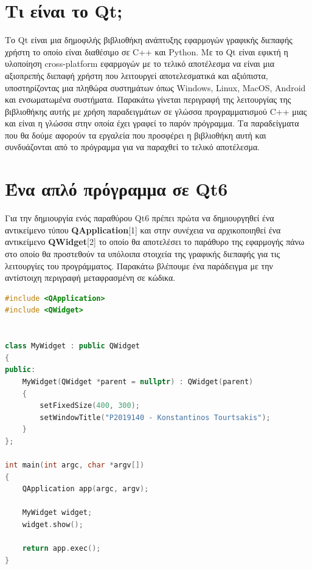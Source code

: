 




\section{Τι είναι το Qt;}
Το Qt είναι μια δημοφιλής βιβλιοθήκη ανάπτυξης εφαρμογών γραφικής διεπαφής 
χρήστη το οποίο είναι διαθέσιμο σε C++ και Python. Με το Qt
είναι εφικτή η υλοποίηση cross-platform εφαρμογών με το τελικό αποτέλεσμα
να είναι μια αξιοπρεπής διεπαφή χρήστη που λειτουργεί αποτελεσματικά και
αξιόπιστα, υποστηρίζοντας μια πληθώρα συστημάτων όπως Windows, Linux, MacOS, Android και ενσωματωμένα συστήματα. 
Παρακάτω γίνεται περιγραφή της λειτουργίας της βιβλιοθήκης αυτής με χρήση παραδειγμάτων σε γλώσσα προγραμματισμού C++ 
μιας και είναι η γλώσσα στην οποία έχει γραφεί το παρόν πρόγραμμα. Τα παραδείγματα
που θα δούμε αφορούν τα εργαλεία που προσφέρει η βιβλιοθήκη αυτή και συνδυάζονται
από το πρόγραμμα για να παραχθεί το τελικό αποτέλεσμα.



\section{Ένα απλό πρόγραμμα σε Qt6}
Για την δημιουργία ενός παραθύρου Qt6 πρέπει πρώτα να δημιουργηθεί ένα αντικείμενο
τύπου \textbf{QApplication}[1] και στην συνέχεια να αρχικοποιηθεί ένα αντικείμενο 
\textbf{QWidget}[2] το οποίο θα αποτελέσει το παράθυρο της εφαρμογής πάνω στο
οποίο θα προστεθούν τα υπόλοιπα στοιχεία της γραφικής διεπαφής για τις λειτουργίες
του προγράμματος. Παρακάτω βλέπουμε ένα παράδειγμα με την αντίστοιχη περιγραφή
μεταφρασμένη σε κώδικα.

\begin{lstlisting}[language=C++, style=cppstyle]
#include <QApplication>
#include <QWidget>


class MyWidget : public QWidget 
{
public:
    MyWidget(QWidget *parent = nullptr) : QWidget(parent) 
    {
        setFixedSize(400, 300);
        setWindowTitle("P2019140 - Konstantinos Tourtsakis");
    }
};

int main(int argc, char *argv[]) 
{
    QApplication app(argc, argv);

    MyWidget widget;
    widget.show();

    return app.exec();
}

\end{lstlisting}


